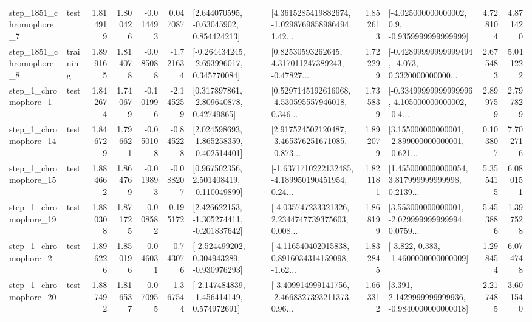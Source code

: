 \begin{tabular}{llrrrrllrlrr}
  step\_1851\_chromophore\_7 &      test &      1.814919 &    1.800426 &     -0.014493 &  0.047087 &     [2.644070595, -0.63045902, 0.854424213] &  [4.3615285419882674, -1.0298769858986494, 1.42... &       1.852613 &     [-4.025000000000002, 0.9, -0.9359999999999999] &            4.728104 &          4.871420 \\
  step\_1851\_chromophore\_8 &  training &      1.899165 &    1.814078 &     -0.085088 & -1.721634 &   [-0.264434245, -2.693996017, 0.345770084] &  [0.82530593262645, 4.317011247389243, -0.47827... &       1.722299 &  [-0.42899999999999494, -4.073, 0.3320000000000... &            2.675483 &          5.041222 \\
     step\_1\_chromophore\_1 &      test &      1.842674 &    1.740679 &     -0.101996 & -2.145259 &     [0.317897861, -2.809640878, 0.42749865] &  [0.5297145192616068, -4.530595557946018, 0.346... &       1.735839 &  [-0.33499999999999996, 4.105000000000002, -0.4... &            2.899759 &          2.797829 \\
    step\_1\_chromophore\_14 &      test &      1.846729 &    1.796621 &     -0.050108 & -0.845228 &   [2.024598693, -1.865258359, -0.402514401] &  [2.917524502120487, -3.465376251671085, -0.873... &       1.892079 &  [3.155000000000001, -2.899000000000001, -0.621... &            0.103807 &          7.702716 \\
    step\_1\_chromophore\_15 &      test &      1.884662 &    1.864769 &     -0.019893 & -0.088207 &    [0.967502356, 2.501408419, -0.110049899] &  [-1.6371710222132485, -4.189950190451954, 0.24... &       1.821181 &  [1.4550000000000054, 3.817999999999998, 0.2139... &            5.355415 &          6.080151 \\
    step\_1\_chromophore\_19 &      test &      1.880308 &    1.871725 &     -0.008582 &  0.195172 &   [2.426622153, -1.305274411, -0.201837642] &  [-4.035747233321326, 2.2344747739375603, 0.008... &       1.868199 &  [3.553000000000001, -2.029999999999994, 0.0759... &            5.453886 &          1.397528 \\
     step\_1\_chromophore\_2 &      test &      1.896226 &    1.850196 &     -0.046031 & -0.743076 &   [-2.524499202, 0.304943289, -0.930976293] &  [-4.116540402015838, 0.8916034314159098, -1.62... &       1.832845 &               [-3.822, 0.383, -1.4600000000000009] &            1.298454 &          6.074748 \\
    step\_1\_chromophore\_20 &      test &      1.887492 &    1.816537 &     -0.070955 & -1.367544 &   [-2.147484839, -1.456414149, 0.574972691] &  [-3.409914999141756, -2.4668327393211373, 0.96... &       1.663312 &   [3.391, 2.1429999999999936, -0.9840000000000018] &            2.217485 &          3.601540 \\

\end{tabular}
